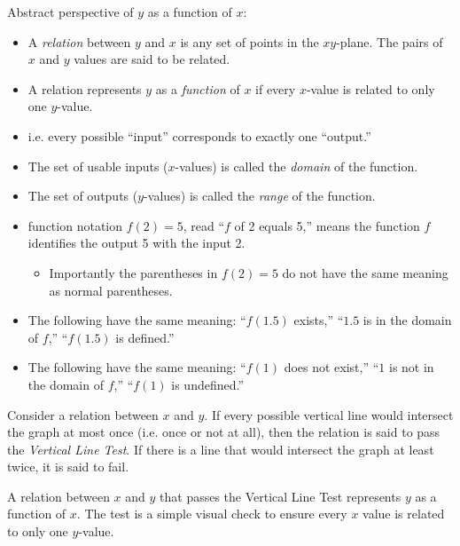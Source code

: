 \documentclass{amsbook}
\numberwithin{section}{chapter}
\numberwithin{equation}{chapter}
\newcommand{\qi}[1]{\begin{itemize}\item #1 \end{itemize}}
\begin{document}
 Abstract perspective of $y$ as a function of $x$:
\begin{itemize}
	\item A \textit{relation} between $y$ and $x$ is any set of points in the $xy$-plane. The pairs of $x$ and $y$ values are said to be related.
	\item A relation represents $y$ as a \textit{function} of $x$ if every $x$-value is related to only one $y$-value.
	\item i.e. every possible ``input'' corresponds to exactly one ``output.'' 
	\item The set of usable inputs ($x$-values) is called the \textit{domain} of the function.
	\item The set of outputs ($y$-values) is called the \textit{range} of the function.
	\item function notation $f(2) = 5$, read ``$f$ of 2 equals 5,'' means the function $f$ identifies the output 5 with the input 2.
	\qi{Importantly the parentheses in $f(2)=5$ do not have the same meaning as normal parentheses.}
	\item The following have the same meaning: ``$f(1.5)$ exists,'' ``$1.5$ is in the domain of $f$,'' ``$f(1.5)$ is defined.''
	\item The following have the same meaning: ``$f(1)$ does not exist,'' ``$1$ is not in the domain of $f$,'' ``$f(1)$ is undefined.''
\end{itemize}
Consider a relation between $x$ and $y$. If every possible vertical line would intersect the graph at most once (i.e. once or not at all), then the relation is said to pass the \textit{Vertical Line Test}. If there is a line that would intersect the graph at least twice, it is said to fail.

A relation between $x$ and $y$ that passes the Vertical Line Test represents $y$ as a function of $x$. The test is a simple visual check to ensure every $x$ value is related to only one $y$-value.
\end{document}
